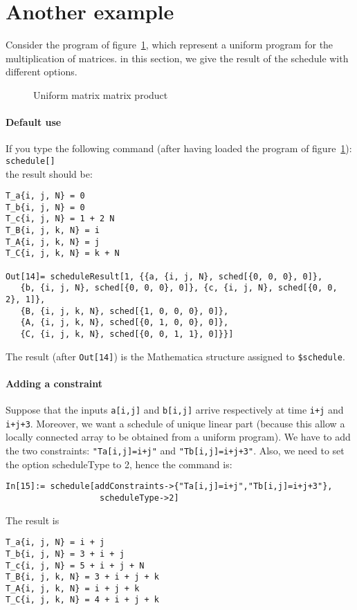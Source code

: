 \section{Another example}
\label{ExampleSched} 
Consider the program of figure~\ref{figSched4}, which represent a
uniform program for the 
multiplication of matrices. in this section, we give the result of the
schedule with different options.
\begin{figure}[htbp]

\caption{Uniform matrix matrix product}
\label{figSched4}
\end{figure}

\paragraph{Default use}
If you type the following command (after having loaded the program of figure~\ref{figSched4}):\\
\texttt{schedule[]}\\
the result should be: 
\begin{verbatim}
T_a{i, j, N} = 0
T_b{i, j, N} = 0
T_c{i, j, N} = 1 + 2 N
T_B{i, j, k, N} = i
T_A{i, j, k, N} = j
T_C{i, j, k, N} = k + N

Out[14]= scheduleResult[1, {{a, {i, j, N}, sched[{0, 0, 0}, 0]}, 
   {b, {i, j, N}, sched[{0, 0, 0}, 0]}, {c, {i, j, N}, sched[{0, 0, 2}, 1]}, 
   {B, {i, j, k, N}, sched[{1, 0, 0, 0}, 0]}, 
   {A, {i, j, k, N}, sched[{0, 1, 0, 0}, 0]}, 
   {C, {i, j, k, N}, sched[{0, 0, 1, 1}, 0]}}]
\end{verbatim}
The result (after \texttt{Out[14]}) is the
Mathematica structure assigned to \texttt{\$schedule}.

\paragraph{Adding a constraint}
Suppose that the inputs \texttt{a[i,j]} and \texttt{b[i,j]} arrive
respectively at time \texttt{i+j} and \texttt{i+j+3}. Moreover, we
want a schedule of unique linear part (because this allow a locally
connected array to be obtained from a uniform program).  We have to
add the two constraints: \texttt{"Ta[i,j]=i+j"} and
\texttt{"Tb[i,j]=i+j+3"}. Also, we need to set the option scheduleType
to 2, hence the command is:
\begin{verbatim}
In[15]:= schedule[addConstraints->{"Ta[i,j]=i+j","Tb[i,j]=i+j+3"},
                   scheduleType->2]
\end{verbatim}
The result is 
\begin{verbatim}
T_a{i, j, N} = i + j
T_b{i, j, N} = 3 + i + j
T_c{i, j, N} = 5 + i + j + N
T_B{i, j, k, N} = 3 + i + j + k
T_A{i, j, k, N} = i + j + k
T_C{i, j, k, N} = 4 + i + j + k
\end{verbatim}

